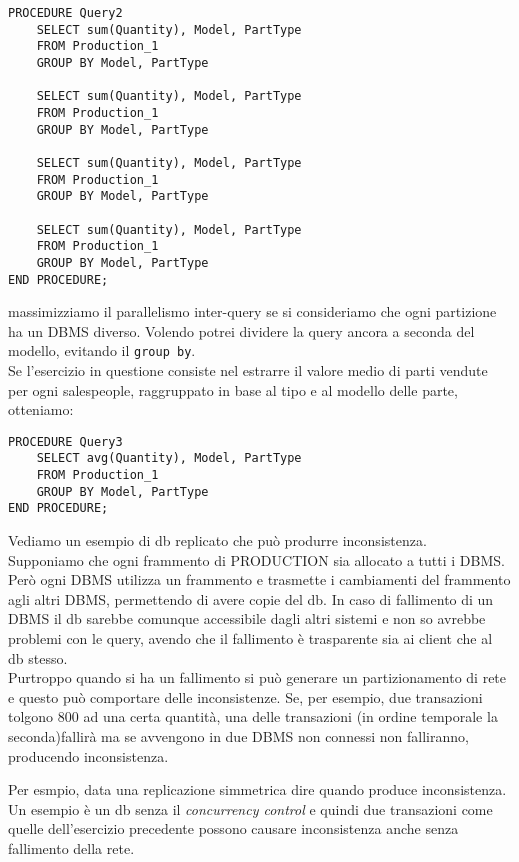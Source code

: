 \begin{lstlisting}
PROCEDURE Query2
    SELECT sum(Quantity), Model, PartType
    FROM Production_1
    GROUP BY Model, PartType
    
    SELECT sum(Quantity), Model, PartType
    FROM Production_1
    GROUP BY Model, PartType
     
    SELECT sum(Quantity), Model, PartType
    FROM Production_1
    GROUP BY Model, PartType
    
    SELECT sum(Quantity), Model, PartType
    FROM Production_1
    GROUP BY Model, PartType
END PROCEDURE;
\end{lstlisting}
massimizziamo il parallelismo inter-query se si consideriamo che ogni partizione ha un DBMS diverso. Volendo potrei dividere la query ancora a seconda del modello, evitando il \texttt{group by}. \\

Se l'esercizio in questione consiste nel estrarre il valore medio di parti vendute per ogni salespeople, raggruppato in base al tipo e al modello delle parte, otteniamo:
\begin{lstlisting}
PROCEDURE Query3 
    SELECT avg(Quantity), Model, PartType
    FROM Production_1 
    GROUP BY Model, PartType
END PROCEDURE;
\end{lstlisting}


Vediamo un esempio di db replicato che può produrre inconsistenza.\\
Supponiamo che ogni frammento di \textnormal{PRODUCTION} sia allocato a tutti i DBMS. Però ogni DBMS utilizza un frammento e trasmette i cambiamenti del frammento agli altri DBMS, permettendo di avere copie del db. In caso di fallimento di un DBMS il db sarebbe comunque accessibile dagli altri sistemi e non so avrebbe problemi con le query, avendo che il fallimento è trasparente sia ai client che al db stesso.\\
Purtroppo quando si ha un fallimento si può generare un partizionamento di rete e questo può comportare delle inconsistenze. Se, per esempio, due transazioni tolgono 800 ad una certa quantità, una delle transazioni  (in ordine temporale la seconda)fallirà ma se avvengono in due DBMS non connessi non falliranno, producendo inconsistenza.

Per esmpio, data una replicazione simmetrica dire quando produce inconsistenza. Un esempio è un db senza il \textit{concurrency control} e quindi due transazioni come quelle dell'esercizio precedente possono causare inconsistenza anche senza fallimento della rete.